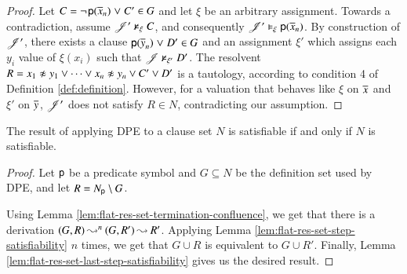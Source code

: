 \begin{rep}
\begin{proof}
      Let $C = \neg{\kern.2ex \mathsf{p}(\overline{x}_{n})} \mathrel{\lor} C' \in G$ and let $\xi$ be
      an arbitrary assignment. Towards a contradiction, assume
      $\mathscr{J}'\nvDash_\xi C$, and consequently $\mathscr{J}' \vDash_\xi
      \mathsf{p}(\overline{x}_{n})$. By construction of $\mathscr{J}'$, there exists a clause
      ${\mathsf{p}(\overline{y}_{n})} \mathrel{\lor} D' \in G$ and an assignment $\xi'$
      which assigns each $y_i$ value of $\xi(x_i)$ such that $\mathscr{J}
      \nvDash_{\xi'} D'$. The resolvent $R = \neqlit{x_1}{y_1} \lor \cdots \lor
      \neqlit{x_n}{y_n} \lor C' \lor D'$ is a tautology, according to condition
      4 of Definition \ref{def:definition}. However, for a valuation that
      behaves like $\xi$ on $\overline{x}_{}$ and $\xi'$ on $\overline{y}_{}$,
      $\mathscr{J}'$ does not satisfy $R \in N$, contradicting our assumption.
   \qedhere
   \end{proof}
\end{rep}
\begin{conf}

\end{conf}
\begin{theorem}
\label{thm:pes-sat-equiv}
   The result of applying DPE to a clause set $N$ is
   satisfiable if and only if $N$ is satisfiable.
\end{theorem}
\begin{rep}
\begin{proof}
   Let $\mathsf{p}$ be a predicate symbol and $G \subseteq N$ be the
   definition set used by DPE, and let $R = N_{\mathsf{p}} \setminus G$.
%

   Using Lemma
   \ref{lem:flat-res-set-termination-confluence}, we get that there is a
   derivation $(G,R) \mathbin\leadsto^n (G,R') \mathbin\leadsto R'$. Applying Lemma
   \ref{lem:flat-res-set-step-satisfiability} $n$ times, we get that $G \cup R$
   is equivalent to $G \cup R'$. Finally, Lemma \ref{lem:flat-res-set-last-step-satisfiability}
   gives us the desired result.
\end{proof}
\end{rep}

